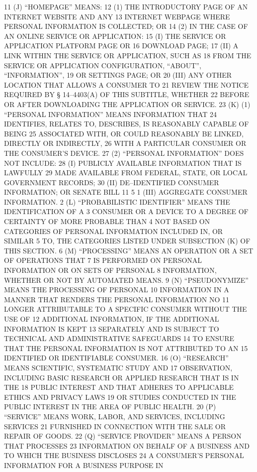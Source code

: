 11 (J) “HOMEPAGE” MEANS:
12 (1) THE INTRODUCTORY PAGE OF AN INTERNET WEBSITE AND ANY
13 INTERNET WEBPAGE WHERE PERSONAL INFORMATION IS COLLECTED; OR
14 (2) IN THE CASE OF AN ONLINE SERVICE OR APPLICATION:
15 (I) THE SERVICE OR APPLICATION PLATFORM PAGE OR
16 DOWNLOAD PAGE;
17 (II) A LINK WITHIN THE SERVICE OR APPLICATION, SUCH AS
18 FROM THE SERVICE OR APPLICATION CONFIGURATION, “ABOUT”, “INFORMATION”,
19 OR SETTINGS PAGE; OR
20 (III) ANY OTHER LOCATION THAT ALLOWS A CONSUMER TO
21 REVIEW THE NOTICE REQUIRED BY § 14–4403(A) OF THIS SUBTITLE, WHETHER
22 BEFORE OR AFTER DOWNLOADING THE APPLICATION OR SERVICE.
23 (K) (1) “PERSONAL INFORMATION” MEANS INFORMATION THAT
24 IDENTIFIES, RELATES TO, DESCRIBES, IS REASONABLY CAPABLE OF BEING
25 ASSOCIATED WITH, OR COULD REASONABLY BE LINKED, DIRECTLY OR INDIRECTLY,
26 WITH A PARTICULAR CONSUMER OR THE CONSUMER’S DEVICE.
27 (2) “PERSONAL INFORMATION” DOES NOT INCLUDE:
28 (I) PUBLICLY AVAILABLE INFORMATION THAT IS LAWFULLY
29 MADE AVAILABLE FROM FEDERAL, STATE, OR LOCAL GOVERNMENT RECORDS;
30 (II) DE–IDENTIFIED CONSUMER INFORMATION; OR
SENATE BILL 11 5
1 (III) AGGREGATE CONSUMER INFORMATION.
2 (L) “PROBABILISTIC IDENTIFIER” MEANS THE IDENTIFICATION OF A
3 CONSUMER OR A DEVICE TO A DEGREE OF CERTAINTY OF MORE PROBABLE THAN
4 NOT BASED ON CATEGORIES OF PERSONAL INFORMATION INCLUDED IN, OR SIMILAR
5 TO, THE CATEGORIES LISTED UNDER SUBSECTION (K) OF THIS SECTION.
6 (M) “PROCESSING” MEANS AN OPERATION OR A SET OF OPERATIONS THAT
7 IS PERFORMED ON PERSONAL INFORMATION OR ON SETS OF PERSONAL
8 INFORMATION, WHETHER OR NOT BY AUTOMATED MEANS.
9 (N) “PSEUDONYMIZE” MEANS THE PROCESSING OF PERSONAL
10 INFORMATION IN A MANNER THAT RENDERS THE PERSONAL INFORMATION NO
11 LONGER ATTRIBUTABLE TO A SPECIFIC CONSUMER WITHOUT THE USE OF
12 ADDITIONAL INFORMATION, IF THE ADDITIONAL INFORMATION IS KEPT
13 SEPARATELY AND IS SUBJECT TO TECHNICAL AND ADMINISTRATIVE SAFEGUARDS
14 TO ENSURE THAT THE PERSONAL INFORMATION IS NOT ATTRIBUTED TO AN
15 IDENTIFIED OR IDENTIFIABLE CONSUMER.
16 (O) “RESEARCH” MEANS SCIENTIFIC, SYSTEMATIC STUDY AND
17 OBSERVATION, INCLUDING BASIC RESEARCH OR APPLIED RESEARCH THAT IS IN THE
18 PUBLIC INTEREST AND THAT ADHERES TO APPLICABLE ETHICS AND PRIVACY LAWS
19 OR STUDIES CONDUCTED IN THE PUBLIC INTEREST IN THE AREA OF PUBLIC HEALTH.
20 (P) “SERVICE” MEANS WORK, LABOR, AND SERVICES, INCLUDING SERVICES
21 FURNISHED IN CONNECTION WITH THE SALE OR REPAIR OF GOODS.
22 (Q) “SERVICE PROVIDER” MEANS A PERSON THAT PROCESSES
23 INFORMATION ON BEHALF OF A BUSINESS AND TO WHICH THE BUSINESS DISCLOSES
24 A CONSUMER’S PERSONAL INFORMATION FOR A BUSINESS PURPOSE IN
